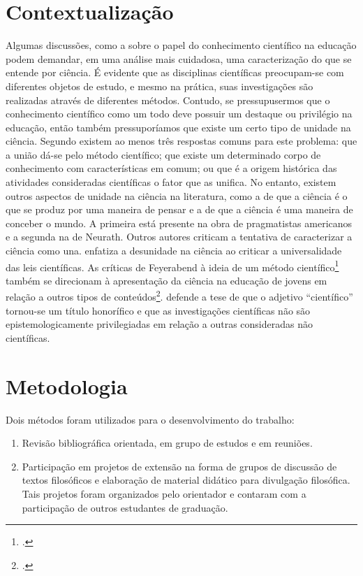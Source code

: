 \documentclass[12pt]{report}
\begin{document}
		\section*{Contextualização}		
		Algumas discussões, como a sobre o papel do conhecimento científico na educação podem demandar, em uma análise mais cuidadosa, uma caracterização do que se entende por ciência.
		É evidente que as disciplinas científicas preocupam-se com diferentes objetos de estudo, e mesmo na prática, suas investigações são realizadas através de diferentes métodos.
		Contudo, se pressupusermos que o conhecimento científico como um todo deve possuir um destaque ou privilégio na educação, então também pressuporíamos que existe um certo tipo de unidade na ciência.
		Segundo \textcite{cunha-unidade} existem ao menos três respostas comuns para este problema: que a união dá-se pelo método científico; que existe um determinado corpo de conhecimento com características em comum; ou que é a origem histórica das atividades consideradas científicas o fator que as unifica.
		No entanto, existem outros aspectos de unidade na ciência na literatura, como a de que a ciência é o que se produz por uma maneira de pensar e a de que a ciência é uma maneira de conceber o mundo. A primeira está presente na obra de pragmatistas americanos e a segunda na de Neurath.
		Outros autores criticam a tentativa de caracterizar a ciência como una.
		\textcite{cartwright-dappled-world} enfatiza a desunidade na ciência ao criticar a universalidade das leis científicas.
		As críticas de Feyerabend à ideia de um método científico\footcite{feyerabend-against-method} também se direcionam à apresentação da ciência na educação de jovens em relação a outros tipos de conteúdos\footcite{feyerabend-science-free-society}.
		\textcite{haack-defending-science} defende a tese de que o adjetivo “científico” tornou-se um título honorífico e que as investigações científicas não são epistemologicamente privilegiadas em relação a outras consideradas não científicas. 
	
		\section*{Metodologia}
		
		Dois métodos foram utilizados para o desenvolvimento do trabalho:
		
		\begin{enumerate}
			\item Revisão bibliográfica orientada, em grupo de estudos e em reuniões.
			\item Participação em projetos de extensão na forma de grupos de discussão de textos filosóficos e elaboração de material didático para divulgação filosófica.
			Tais projetos foram organizados pelo orientador e contaram com a participação de outros estudantes de graduação. 
		\end{enumerate}
\end{document}
